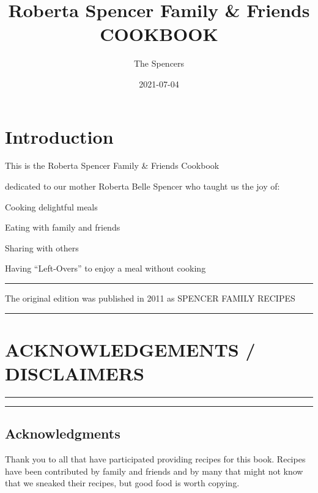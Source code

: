 \documentclass[
]{book}
\title{Roberta Spencer Family \& Friends COOKBOOK}
\author{The Spencers}
\date{2021-07-04}
\begin{document}
\maketitle

{
\setcounter{tocdepth}{1}
\tableofcontents
}
\hypertarget{introduction}{%
\chapter{Introduction}\label{introduction}}

This is the Roberta Spencer Family \& Friends Cookbook

dedicated to our mother Roberta Belle Spencer who taught us the joy of:

Cooking delightful meals

Eating with family and friends

Sharing with others

Having ``Left-Overs'' to enjoy a meal without cooking

\begin{center}\rule{0.5\linewidth}{0.5pt}\end{center}

The original edition was published in 2011 as SPENCER FAMILY RECIPES

\begin{center}\rule{0.5\linewidth}{0.5pt}\end{center}

\hypertarget{acknowledgements-disclaimers}{%
\chapter*{ACKNOWLEDGEMENTS / DISCLAIMERS}\label{acknowledgements-disclaimers}}


\begin{center}\rule{0.5\linewidth}{0.5pt}\end{center}

\begin{center}\rule{0.5\linewidth}{0.5pt}\end{center}

\hypertarget{acknowledgments}{%
\section*{Acknowledgments}\label{acknowledgments}}


Thank you to all that have participated providing recipes for this book. Recipes have been contributed by family and friends and by many that might not know that we sneaked their recipes, but good food is worth copying.
\end{document}
